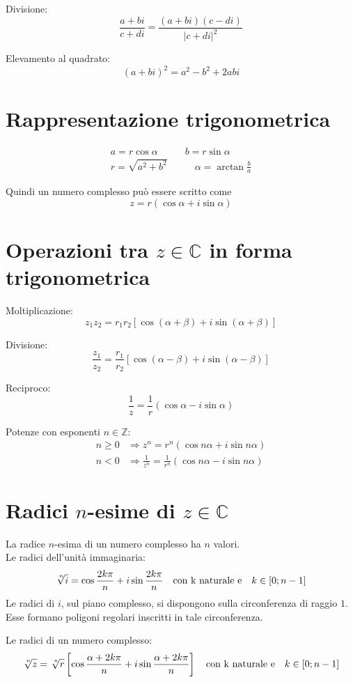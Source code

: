 \documentclass{article}
\begin{document}
\noindent Divisione:
$$ \frac{a+bi}{c+di} = \frac{(a+bi)(c-di)}{|c+di|^2} $$

\noindent Elevamento al quadrato:
$$ (a+bi)^2 = a^2 - b^2 + 2abi $$

\section*{Rappresentazione trigonometrica}
\begin{align*}
    a =r\cos{\alpha}& \hspace{1em} b =r\sin{\alpha} \\
    r = \sqrt{a^2+b^2}& \hspace{2em} \alpha = \arctan{\frac{b}{a}}
\end{align*}

Quindi un numero complesso può essere scritto come
$$ z = r(\cos{\alpha} + i\sin{\alpha}) $$

\section*{Operazioni tra $z\in\mathbb{C}$ in forma trigonometrica}
Moltiplicazione:
$$ z_1 z_2 = r_1r_2[\cos{(\alpha+\beta)}+i\sin{(\alpha+\beta)}] $$

\noindent Divisione:
$$ \frac{z_1}{z_2} = \frac{r_1}{r_2}[\cos{(\alpha-\beta)}+i\sin{(\alpha-\beta)}] $$

\noindent Reciproco:
$$ \frac{1}{z} = \frac{1}{r}(\cos{\alpha} - i\sin{\alpha}) $$

\noindent Potenze con esponenti $n \in \mathbb{Z}$:
\begin{align*}
    n \geq 0 &\Longrightarrow z^n = r^n(\cos{n\alpha} + i\sin{n\alpha}) \\
    n < 0 &\Longrightarrow \frac{1}{z^n} = \frac{1}{r^n}(\cos{n\alpha} - i\sin{n\alpha})
\end{align*}

\section*{Radici $n$-esime di $z\in\mathbb{C}$}
La radice $n$-esima di un numero complesso ha $n$ valori. \\
Le radici dell'unità immaginaria:
$$ \sqrt[\leftroot{-2}\uproot{2}n]{i} = \cos{\frac{2k\pi}{n}} + i\sin{\frac{2k\pi}{n}} \hspace{1em} \text{con k naturale e} \hspace{1em} k \in [0;n-1]$$
Le radici di $i$, sul piano complesso, si dispongono sulla circonferenza di raggio $1$. Esse formano poligoni regolari inscritti in tale circonferenza.

\vspace{1em}

Le radici di un numero complesso:
$$ \sqrt[\leftroot{-2}\uproot{2}n]{z} = \sqrt[\leftroot{-2}\uproot{2}n]{r}\left[\cos{\frac{\alpha+2k\pi}{n}} + i\sin{\frac{\alpha+2k\pi}{n}}\right] \hspace{1em} \text{con k naturale e} \hspace{1em} k \in [0;n-1]$$
\end{document}
